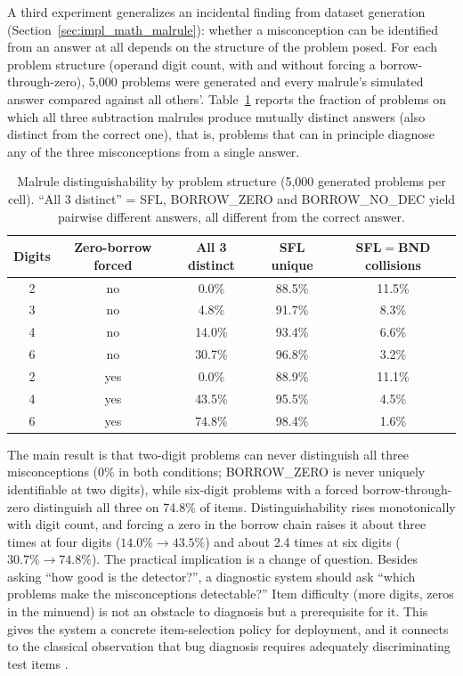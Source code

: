 A third experiment generalizes an incidental finding from dataset generation (Section~\ref{sec:impl_math_malrule}): whether a misconception can be identified from an answer at all depends on the structure of the problem posed. For each problem structure (operand digit count, with and without forcing a borrow-through-zero), 5{,}000 problems were generated and every malrule's simulated answer compared against all others'. Table~\ref{tab:distinguish} reports the fraction of problems on which all three subtraction malrules produce mutually distinct answers (also distinct from the correct one), that is, problems that can in principle diagnose any of the three misconceptions from a single answer.

\begin{table}[h]
\centering
\caption[Malrule distinguishability by problem structure (5{,}000 generated problems per cell).]{Malrule distinguishability by problem structure (5{,}000 generated problems per cell). ``All 3 distinct'' = SFL, BORROW\_ZERO and BORROW\_NO\_DEC yield pairwise different answers, all different from the correct answer.}
\label{tab:distinguish}
\begin{tabular}{ccccc}
\toprule
\textbf{Digits} & \textbf{Zero-borrow forced} & \textbf{All 3 distinct} & \textbf{SFL unique} & \textbf{SFL$=$BND collisions} \\
\midrule
2 & no  & 0.0\%  & 88.5\% & 11.5\% \\
3 & no  & 4.8\%  & 91.7\% & 8.3\% \\
4 & no  & 14.0\% & 93.4\% & 6.6\% \\
6 & no  & 30.7\% & 96.8\% & 3.2\% \\
2 & yes & 0.0\%  & 88.9\% & 11.1\% \\
4 & yes & 43.5\% & 95.5\% & 4.5\% \\
6 & yes & 74.8\% & 98.4\% & 1.6\% \\
\bottomrule
\end{tabular}
\end{table}

The main result is that two-digit problems can never distinguish all three misconceptions (0\% in both conditions; BORROW\_ZERO is never uniquely identifiable at two digits), while six-digit problems with a forced borrow-through-zero distinguish all three on 74.8\% of items. Distinguishability rises monotonically with digit count, and forcing a zero in the borrow chain raises it about three times at four digits ($14.0\% \rightarrow 43.5\%$) and about 2.4 times at six digits ($30.7\% \rightarrow 74.8\%$). The practical implication is a change of question. Besides asking ``how good is the detector?'', a diagnostic system should ask ``which problems make the misconceptions detectable?'' Item difficulty (more digits, zeros in the minuend) is not an obstacle to diagnosis but a prerequisite for it. This gives the system a concrete item-selection policy for deployment, and it connects to the classical observation that bug diagnosis requires adequately discriminating test items \parencite{VanLehn1990}.

